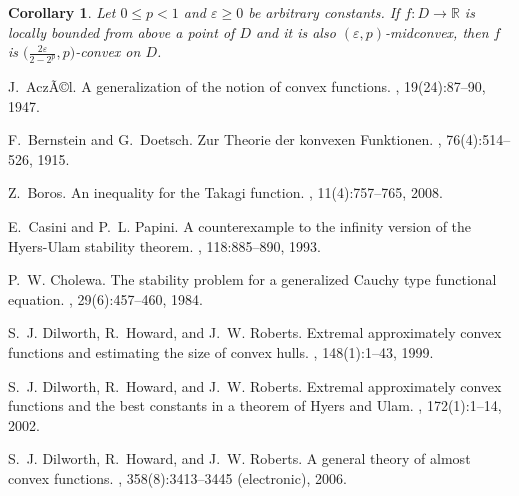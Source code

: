 \documentclass[12pt,leqno]{amsart}
\newtheorem{corollary}[theorem]{Corollary}
\newtheorem*{corollary*}{Corollary}
\theoremstyle{definition}
\begin{document}
{
             {\begin{corollary}\label{C{10}}{Let $0\leq p<1$ and ${\varepsilon}\geq 0$ be arbitrary constants. 
If $f:D\to {\mathbb{R}}$ is locally bounded from above a point of $D$ and it is also $({\varepsilon},p)$-midconvex, 
then $f$ is $\big(\frac{2{\varepsilon}}{2-2^p},p\big)$-convex on $D$.}\end{corollary}}}

\begin{thebibliography}{10}

J.~AczÃ©l.
\newblock A generalization of the notion of convex functions.
, 19(24):87--90, 1947.

F.~Bernstein and G.~Doetsch.
\newblock Zur {T}heorie der konvexen {F}unktionen.
, 76(4):514--526, 1915.

Z.~Boros.
\newblock An inequality for the {T}akagi function.
, 11(4):757--765, 2008.

E.~Casini and P.~L. Papini.
\newblock A counterexample to the infinity version of the {H}yers-{U}lam
  stability theorem.
, 118:885--890, 1993.

P.~W. Cholewa.
\newblock The stability problem for a generalized {C}auchy type functional
  equation.
, 29(6):457--460, 1984.

S.~J. Dilworth, R.~Howard, and J.~W. Roberts.
\newblock Extremal approximately convex functions and estimating the size of
  convex hulls.
, 148(1):1--43, 1999.

S.~J. Dilworth, R.~Howard, and J.~W. Roberts.
\newblock Extremal approximately convex functions and the best constants in a
  theorem of {H}yers and {U}lam.
, 172(1):1--14, 2002.

S.~J. Dilworth, R.~Howard, and J.~W. Roberts.
\newblock A general theory of almost convex functions.
, 358(8):3413--3445 (electronic), 2006.


\end{thebibliography}
\end{document}
